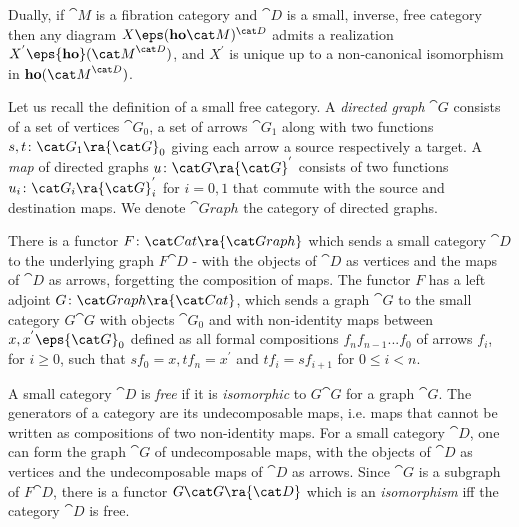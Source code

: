 Dually, if ${\cat M}$ is a fibration category and ${\cat D}$ is a small, inverse, free category then any diagram $X \eps ({\bf ho}{\cat M})^{\cat D}$ admits a realization $X^{'} \eps {\bf ho}({\cat M}^{\cat D})$, and $X^{'}$ is unique up to a non-canonical isomorphism in ${\bf ho}({\cat M}^{\cat D})$. 

Let us recall the definition of a small free category. A {\it directed graph} ${\cat G}$ consists of a set of vertices ${\cat G}_0$, a set of arrows ${\cat G}_1$ along with two functions $s, t \colon {\cat G}_1 \ra {\cat G}_0$ giving each arrow a source respectively a target. A {\it map} of directed graphs $u \colon {\cat G} \ra {\cat G}^{'}$ consists of two functions $u_i \colon {\cat G}_i \ra {\cat G}^{'}_i$ for $i = 0, 1$ that commute with the source and destination maps. We denote ${\cat Graph}$ the category of directed graphs. 

There is a functor $F \colon {\cat Cat} \ra {\cat Graph}$ which sends a small category ${\cat D}$ to the underlying graph $F{\cat D}$ - with the objects of ${\cat D}$ as vertices and the maps of ${\cat D}$ as arrows, forgetting the composition of maps. The functor $F$ has a left adjoint $G \colon {\cat Graph} \ra {\cat Cat}$, which sends a graph ${\cat G}$ to the small category $G{\cat G}$ with objects ${\cat G}_0$ and with non-identity maps between $x, x^{'} \eps {\cat G}_0$ defined as all formal compositions $f_nf_{n-1}...f_0$ of arrows $f_i$, for $i \ge 0$, such that $sf_0 = x, tf_n = x^{'}$ and $tf_i = sf_{i+1}$ for $0 \le i < n$.

A small category ${\cat D}$ is {\it free} if it is {\it isomorphic} to $G{\cat G}$ for a graph ${\cat G}$. The generators of a category are its undecomposable maps, i.e. maps that cannot be written as compositions of two non-identity maps. For a small category ${\cat D}$, one can form the graph ${\cat G}$ of undecomposable maps, with the objects of ${\cat D}$ as vertices and the undecomposable maps of ${\cat D}$ as arrows. Since ${\cat G}$ is a subgraph of $F{\cat D}$, there is a functor $G{\cat G} \ra {\cat D}$ which is an {\it isomorphism} iff the category ${\cat D}$ is free.


